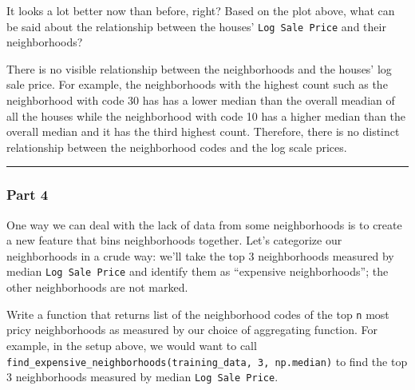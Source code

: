 \documentclass[11pt]{article}
\begin{document}
It looks a lot better now than before, right? Based on the plot above,
what can be said about the relationship between the houses'
\texttt{Log\ Sale\ Price} and their neighborhoods?

    There is no visible relationship between the neighborhoods and the
houses' log sale price. For example, the neighborhoods with the highest
count such as the neighborhood with code 30 has has a lower median than
the overall meadian of all the houses while the neighborhood with code
10 has a higher median than the overall median and it has the third
highest count. Therefore, there is no distinct relationship between the
neighborhood codes and the log scale prices.

    \begin{center}\rule{0.5\linewidth}{0.5pt}\end{center}

\hypertarget{part-4}{%
\subsubsection{Part 4}\label{part-4}}

One way we can deal with the lack of data from some neighborhoods is to
create a new feature that bins neighborhoods together. Let's categorize
our neighborhoods in a crude way: we'll take the top 3 neighborhoods
measured by median \texttt{Log\ Sale\ Price} and identify them as
``expensive neighborhoods''; the other neighborhoods are not marked.

Write a function that returns list of the neighborhood codes of the top
\texttt{n} most pricy neighborhoods as measured by our choice of
aggregating function. For example, in the setup above, we would want to
call
\texttt{find\_expensive\_neighborhoods(training\_data,\ 3,\ np.median)}
to find the top 3 neighborhoods measured by median
\texttt{Log\ Sale\ Price}.
\end{document}
